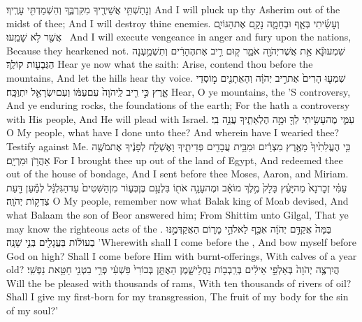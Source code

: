 {וְנָתַשְׁתִּ֥י אֲשֵׁירֶ֖יךָ מִקִּרְבֶּ֑ךָ וְהִשְׁמַדְתִּ֖י עָרֶֽיךָ׃}
{And I will pluck up thy Asherim out of the midst of thee; And I will destroy thine enemies.}
{וְעָשִׂ֜יתִי בְּאַ֧ף וּבְחֵמָ֛ה נָקָ֖ם אֶת\maqqaf הַגּוֹיִ֑ם אֲשֶׁ֖ר לֹ֥א שָׁמֵֽעוּ׃ \petucha }
{And I will execute vengeance in anger and fury upon the nations, Because they hearkened not.}
\newperek
{}
{שִׁמְעוּ\maqqaf נָ֕א אֵ֥ת אֲשֶׁר\maqqaf יְהֹוָ֖ה אֹמֵ֑ר ק֚וּם רִ֣יב אֶת\maqqaf הֶהָרִ֔ים וְתִשְׁמַ֥עְנָה הַגְּבָע֖וֹת קוֹלֶֽךָ׃}
{Hear ye now what the \lord\space saith: Arise, contend thou before the mountains, And let the hills hear thy voice.}
{שִׁמְע֤וּ הָרִים֙ אֶת\maqqaf רִ֣יב יְהֹוָ֔ה וְהָאֵתָנִ֖ים מ֣וֹסְדֵי אָ֑רֶץ כִּ֣י רִ֤יב לַֽיהֹוָה֙ עִם\maqqaf עַמּ֔וֹ וְעִם\maqqaf יִשְׂרָאֵ֖ל יִתְוַכָּֽח׃}
{Hear, O ye mountains, the \lord’S controversy, And ye enduring rocks, the foundations of the earth; For the \lord\space hath a controversy with His people, And He will plead with Israel.}
{עַמִּ֛י מֶה\maqqaf עָשִׂ֥יתִי לְךָ֖ וּמָ֣ה הֶלְאֵתִ֑יךָ עֲנֵ֥ה בִֽי׃}
{O My people, what have I done unto thee? And wherein have I wearied thee? Testify against Me.}
{כִּ֤י הֶעֱלִתִ֙יךָ֙ מֵאֶ֣רֶץ מִצְרַ֔יִם וּמִבֵּ֥ית עֲבָדִ֖ים פְּדִיתִ֑יךָ וָאֶשְׁלַ֣ח לְפָנֶ֔יךָ אֶת\maqqaf מֹשֶׁ֖ה אַהֲרֹ֥ן וּמִרְיָֽם׃}
{For I brought thee up out of the land of Egypt, And redeemed thee out of the house of bondage, And I sent before thee Moses, Aaron, and Miriam.}
{עַמִּ֗י זְכׇר\maqqaf נָא֙ מַה\maqqaf יָּעַ֗ץ בָּלָק֙ מֶ֣לֶךְ מוֹאָ֔ב וּמֶה\maqqaf עָנָ֥ה אֹת֖וֹ בִּלְעָ֣ם בֶּן\maqqaf בְּע֑וֹר מִן\maqqaf הַשִּׁטִּים֙ עַד\maqqaf הַגִּלְגָּ֔ל לְמַ֕עַן דַּ֖עַת צִדְק֥וֹת יְהֹוָֽה׃}
{O My people, remember now what Balak king of Moab devised, And what Balaam the son of Beor answered him; From Shittim unto Gilgal, That ye may know the righteous acts of the \lord.}
{בַּמָּה֙ אֲקַדֵּ֣ם יְהֹוָ֔ה אִכַּ֖ף לֵאלֹהֵ֣י מָר֑וֹם הַאֲקַדְּמֶ֣נּוּ בְעוֹל֔וֹת בַּעֲגָלִ֖ים בְּנֵ֥י שָׁנָֽה׃}
{’Wherewith shall I come before the \lord, And bow myself before God on high? Shall I come before Him with burnt-offerings, With calves of a year old?}
{הֲיִרְצֶ֤ה יְהֹוָה֙ בְּאַלְפֵ֣י אֵילִ֔ים בְּרִֽבְב֖וֹת נַחֲלֵי\maqqaf שָׁ֑מֶן הַאֶתֵּ֤ן בְּכוֹרִי֙ פִּשְׁעִ֔י פְּרִ֥י בִטְנִ֖י חַטַּ֥את נַפְשִֽׁי׃}
{Will the \lord\space be pleased with thousands of rams, With ten thousands of rivers of oil? Shall I give my first-born for my transgression, The fruit of my body for the sin of my soul?’}
